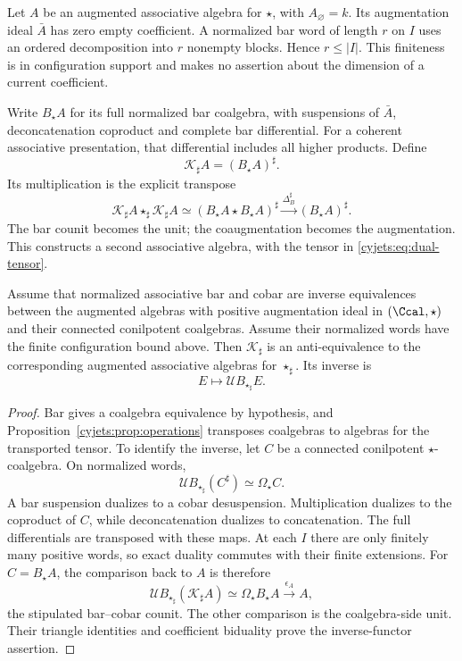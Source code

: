 Let $A$ be an augmented associative algebra for $\star$, with
$A_\varnothing=k$. Its augmentation ideal $\bar A$ has zero
empty coefficient. A normalized bar word of length $r$ on $I$
uses an ordered decomposition into $r$ nonempty blocks. Hence
$r\leq|I|$. This finiteness is in configuration support and makes
no assertion about the dimension of a current coefficient.

Write $B_\star A$ for its full normalized bar coalgebra, with
suspensions of $\bar A$, deconcatenation coproduct and complete
bar differential. For a coherent associative presentation, that
differential includes all higher products. Define
\begin{equation}\label{cyjets:eq:bar-dual}
 \mathcal K_\sharp A=(B_\star A)^\sharp.
\end{equation}
Its multiplication is the explicit transpose
\[
 \mathcal K_\sharp A\star_\sharp\mathcal K_\sharp A
 \simeq(B_\star A\star B_\star A)^\sharp
 \xrightarrow{\Delta_B^\sharp}(B_\star A)^\sharp.
\]
The bar counit becomes the unit; the coaugmentation becomes the
augmentation. This constructs a second associative algebra, with
the tensor in \eqref{cyjets:eq:dual-tensor}.

\begin{theorem}\label{cyjets:thm:bar-duality}
Assume that normalized associative bar and cobar are inverse
equivalences between the augmented algebras with positive
augmentation ideal in $(\Ccal,\star)$ and their connected
conilpotent coalgebras. Assume their normalized words have the
finite configuration bound above. Then $\mathcal K_\sharp$ is an
anti-equivalence to the corresponding augmented associative algebras
for $\star_\sharp$. Its inverse is
\[
 E\longmapsto\mathcal U B_{\star_\sharp}E.
\]
\end{theorem}
\begin{proof}
Bar gives a coalgebra equivalence by hypothesis, and
Proposition~\ref{cyjets:prop:operations} transposes coalgebras to
algebras for the transported tensor. To identify the inverse, let
$C$ be a connected conilpotent $\star$-coalgebra. On normalized
words,
\[
 \mathcal U B_{\star_\sharp}(C^\sharp)\simeq\Omega_\star C.
\]
A bar suspension dualizes to a cobar desuspension. Multiplication
dualizes to the coproduct of $C$, while deconcatenation dualizes
to concatenation. The full differentials are transposed with these
maps. At each $I$ there are only finitely many positive words,
so exact duality commutes with their finite extensions.
For $C=B_\star A$, the comparison back to $A$ is therefore
\[
 \mathcal U B_{\star_\sharp}(\mathcal K_\sharp A)
       \simeq\Omega_\star B_\star A\xrightarrow{\epsilon_A}A,
\]
the stipulated bar--cobar counit. The other comparison is the
coalgebra-side unit. Their triangle identities and coefficient
biduality prove the inverse-functor assertion.
\end{proof}

